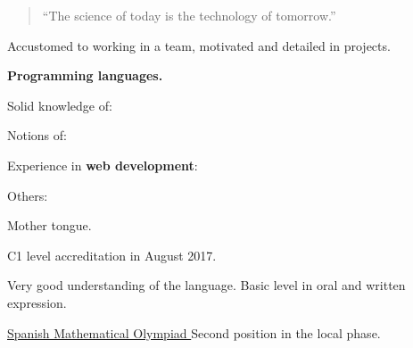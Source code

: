

\begin{quote}
  ``The science of today is the technology of tomorrow.''
\end{quote}


Accustomed to working in a team, motivated and detailed in projects.

\divider

\textbf{Programming languages.} \\ \medskip

Solid knowledge of:

\begin{center}
\end{center}

Notions of: \quad
{}

\divider

Experience in \textbf{web development}:
\vspace{-.05cm}
\begin{center}
\end{center}
\vspace{-.25cm}

\divider

Others: \quad
{}
\cvtag{\LaTeX}

\medskip



\smallskip
Mother tongue.
\vspace{-.35cm}
\divider

\smallskip
C1 level accreditation in August 2017.
\vspace{-.35cm}
\divider

\smallskip
Very good understanding of the language. Basic level in oral and written
expression.

\medskip


\cvachievement{\faTrophy}
{\href{http://www.olimpiadamatematica.es/platea.pntic.mec.es/_csanchez/olimmain.html}
  {Spanish Mathematical Olympiad \smallskip}}
{\small{}%
  \small{}}
Second position in the local phase.

